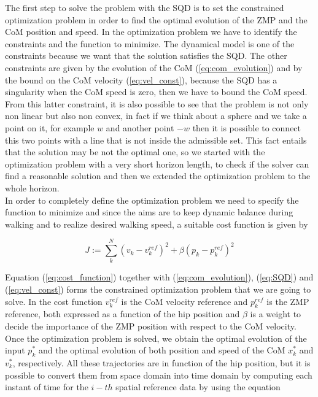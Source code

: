 \documentclass[a4paper]{article}
\begin{document}
The first step to solve the problem with the SQD is to set the constrained optimization problem in order to find the optimal evolution of the ZMP and the CoM position and speed. In the optimization problem we have to identify the constraints and the function to minimize. The dynamical model is one of the constraints because we want that the solution satisfies the SQD. The other constraints are given by the evolution of the CoM (\ref{eq:com_evolution}) and by the bound on the CoM velocity (\ref{eq:vel_const}), because the SQD has a singularity when the CoM speed is zero, then we have to bound the CoM speed. From this latter constraint, it is also possible to see that the problem is not only non linear but also non convex, in fact if we think about a sphere and we take a point on it, for example $w$ and another point $-w$ then it is possible to connect this two points with a line that is not inside the admissible set. This fact entails that the solution may be not the optimal one, so we started with the optimization problem with a very short horizon length, to check if the solver can find a reasonable solution and then we extended the optimization problem to the whole horizon.\\
In order to completely define the optimization problem we need to specify the function to minimize and since the aims are to keep dynamic balance during walking and to realize desired walking speed, a suitable cost function is given by 


\begin{equation}
J := \sum_k^N{(v_k-v_k^{ref})^2+\beta(p_k-p_k^{ref})^2}
\label{eq:cost_function}
\end{equation}  


Equation (\ref{eq:cost_function}) together with (\ref{eq:com_evolution}), (\ref{eq:SQD}) and (\ref{eq:vel_const}) forms the constrained optimization problem that we are going to solve. In the cost function $v_k^{ref}$ is the CoM velocity reference and $p_k^{ref}$ is the ZMP reference, both expressed as a function of the hip position and $\beta$ is a weight to decide the importance of the ZMP position with respect to the CoM velocity.\\

Once the optimization problem is solved, we obtain the optimal evolution of the input $p_k^*$ and the optimal evolution of both  position and  speed of the CoM $x_k^*$ and $v_k^*$, respectively. All these trajectories are in function of the hip position, but it is possible to convert them from space domain into time domain by computing each instant of time for the $i-th$ spatial reference data by using the equation 
\end{document}
